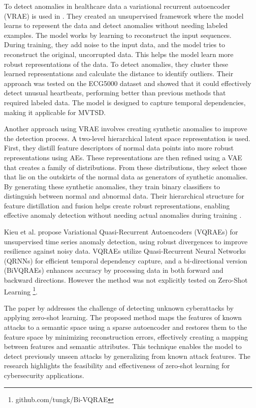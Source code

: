 To detect anomalies in healthcare data a variational recurrent autoencoder (VRAE) is used in \cite{pereira_learning_2019}. They created an unsupervised framework where the model learns to represent the data and detect anomalies without needing labeled examples.
The model works by learning to reconstruct the input sequences. During training, they add noise to the input data, and the model tries to reconstruct the original, uncorrupted data. This helps the model learn more robust representations of the data. To detect anomalies, they cluster these learned representations and calculate the distance to identify outliers. Their approach was tested on the ECG5000 dataset and showed that it could effectively detect unusual heartbeats, performing better than previous methods that required labeled data. The model is designed to capture temporal dependencies, making it applicable for MVTSD.

%
Another approach using VRAE involves creating synthetic anomalies to improve the detection process. A two-level hierarchical latent space representation is used. First, they distill feature descriptors of normal data points into more robust representations using AEs. These representations are then refined using a VAE that creates a family of distributions. From these distributions, they select those that lie on the outskirts of the normal data as generators of synthetic anomalies.
By generating these synthetic anomalies, they train binary classifiers to distinguish between normal and abnormal data. Their hierarchical structure for feature distillation and fusion helps create robust representations, enabling effective anomaly detection without needing actual anomalies during training \cite{ramirez_rivera_anomaly_2022}.

Kieu et al. propose Variational Quasi-Recurrent Autoencoders (VQRAEs) for unsupervised time series anomaly detection, using robust divergences to improve resilience against noisy data. VQRAEs utilize Quasi-Recurrent Neural Networks (QRNNs) for efficient temporal dependency capture, and a bi-directional version (BiVQRAEs) enhances accuracy by processing data in both forward and backward directions. However the method was not explicitly tested on Zero-Shot Learning \cite{kieu_anomaly_2022} \footnote{\fussy\tiny github.com/tungk/Bi-VQRAE}.


The paper by \cite{zhang_unknown_2020} addresses the challenge of detecting unknown cyberattacks by applying zero-shot learning. The proposed method maps the features of known attacks to a semantic space using a sparse autoencoder and restores them to the feature space by minimizing reconstruction errors, effectively creating a mapping between features and semantic attributes. This technique enables the model to detect previously unseen attacks by generalizing from known attack features. The research highlights the feasibility and effectiveness of zero-shot learning for cybersecurity applications.


